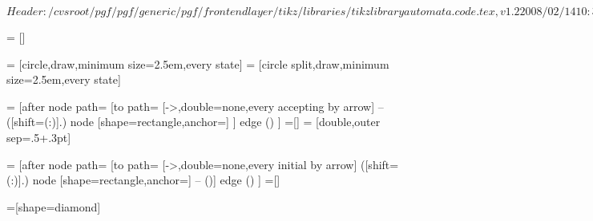 %
%
%

\ProvidesFileRCS[v\pgfversion] $Header: /cvsroot/pgf/pgf/generic/pgf/frontendlayer/tikz/libraries/tikzlibraryautomata.code.tex,v 1.2 2008/02/14 10:31:22 tantau Exp $

\usetikzlibrary{shapes.multipart}


=           []

=  [circle,draw,minimum size=2.5em,every state]
=     [circle split,draw,minimum size=2.5em,every state]

=    [after node path=
{
  {
    [to path=
    {
      [->,double=none,every accepting by arrow]
      --
      ([shift=(\tikz@accepting@angle:\tikz@accepting@distance)]\tikztostart.\tikz@accepting@angle)
          node [shape=rectangle,anchor=\tikz@accepting@anchor] {\tikz@accepting@text}
      }]
    edge ()
  }
}]
=[]
= [double,outer sep=.5\pgflinewidth+.3pt] %

=   [after node path=
{
  {
    [to path=
    {
      [->,double=none,every initial by arrow]
      ([shift=(\tikz@initial@angle:\tikz@initial@distance)]\tikztostart.\tikz@initial@angle)
          node [shape=rectangle,anchor=\tikz@initial@anchor] {\tikz@initial@text}
        -- (\tikztostart)}]
    edge ()
  }
}]
=[]

=[shape=diamond]





